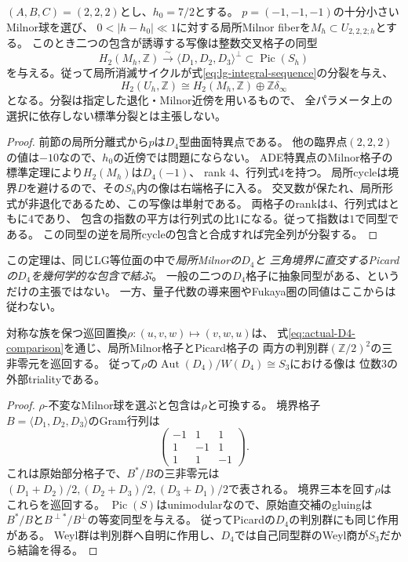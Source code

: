 \begin{theorem}[局所Milnor格子とPicard格子の実際の同型]
\label{thm:lg-D4-Picard}
$(A,B,C)=(2,2,2)$とし、$h_0=7/2$とする。
$p=(-1,-1,-1)$の十分小さいMilnor球を選び、
$0<|h-h_0|\ll1$に対する局所Milnor fiberを$M_h\subset U_{2,2,2;h}$とする。
このとき二つの包含が誘導する写像は整数交叉格子の同型
\begin{equation}\label{eq:actual-D4-comparison}
 H_2(M_h,\mathbb Z)\xrightarrow{\ \sim\ }
 \langle D_1,D_2,D_3\rangle^\perp\subset\operatorname{Pic}(S_h)
\end{equation}
を与える。従って局所消滅サイクルが式\eqref{eq:lg-integral-sequence}の分裂を与え、
\[
 H_2(U_h,\mathbb Z)\cong H_2(M_h,\mathbb Z)\oplus\mathbb Z\delta_\infty
\]
となる。分裂は指定した退化・Milnor近傍を用いるもので、
全パラメータ上の選択に依存しない標準分裂とは主張しない。
\end{theorem}
\begin{proof}
前節の局所分離式から$p$は$D_4$型曲面特異点である。
他の臨界点$(2,2,2)$の値は$-10$なので、$h_0$の近傍では問題にならない。
ADE特異点のMilnor格子の標準定理により$H_2(M_h)$は$D_4(-1)$、
rank $4$、行列式$4$を持つ。
局所cycleは境界$D$を避けるので、その$S_h$内の像は右端格子に入る。
交叉数が保たれ、局所形式が非退化であるため、この写像は単射である。
両格子のrankは$4$、行列式はともに$4$であり、
包含の指数の平方は行列式の比$1$になる。従って指数は$1$で同型である。
この同型の逆を局所cycleの包含と合成すれば完全列が分裂する。
\end{proof}

この定理は、同じLG等位面の中で\emph{局所Milnorの$D_4$と
三角境界に直交するPicardの$D_4$を幾何学的な包含で結ぶ}。
一般の二つの$D_4$格子に抽象同型がある、というだけの主張ではない。
一方、量子代数の導来圏やFukaya圏の同値はここからは従わない。

\begin{corollary}[外部trialityを検出する判別群]
\label{cor:lg-picard-triality}
対称な族を保つ巡回置換$\rho:(u,v,w)\mapsto(v,w,u)$は、
式\eqref{eq:actual-D4-comparison}を通じ、局所Milnor格子とPicard格子の
両方の判別群$(\mathbb Z/2)^2$の三非零元を巡回する。
従って$\rho$の$\operatorname{Aut}(D_4)/W(D_4)\cong S_3$における像は
位数$3$の外部trialityである。
\end{corollary}
\begin{proof}
$\rho$-不変なMilnor球を選ぶと包含は$\rho$と可換する。
境界格子$B=\langle D_1,D_2,D_3\rangle$のGram行列は
\[
 \begin{pmatrix}-1&1&1\\1&-1&1\\1&1&-1\end{pmatrix}.
\]
これは原始部分格子で、$B^*/B$の三非零元は
$(D_1+D_2)/2,(D_2+D_3)/2,(D_3+D_1)/2$で表される。
境界三本を回す$\rho$はこれらを巡回する。
$\operatorname{Pic}(S)$はunimodularなので、原始直交補のgluingは
$B^*/B$と$B^{\perp*}/B^\perp$の等変同型を与える。
従ってPicardの$D_4$の判別群にも同じ作用がある。
Weyl群は判別群へ自明に作用し、$D_4$では自己同型群のWeyl商が$S_3$だから結論を得る。
\end{proof}

